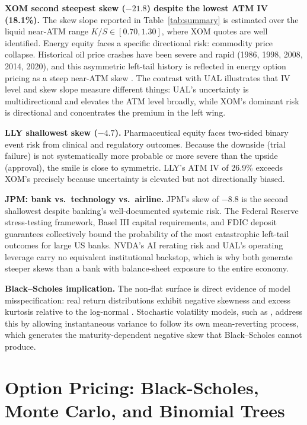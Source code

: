 \documentclass[12pt, a4paper]{article}
\begin{document}
\textbf{XOM second steepest skew ($-21.8$) despite the lowest ATM IV (18.1\%).} The
skew slope reported in Table~\ref{tab:summary} is estimated over the liquid near-ATM
range $K/S \in [0.70, 1.30]$, where XOM quotes are well identified. Energy equity faces
a specific directional risk: commodity price collapse. Historical oil price crashes have
been severe and rapid (1986, 1998, 2008, 2014, 2020), and this asymmetric left-tail
history is reflected in energy option pricing as a steep near-ATM skew \citep{Doran2008}.
The contrast with UAL illustrates that IV level and skew slope measure different things:
UAL's uncertainty is multidirectional and elevates the ATM level broadly, while XOM's
dominant risk is directional and concentrates the premium in the left wing.

\textbf{LLY shallowest skew ($-4.7$).} Pharmaceutical equity faces two-sided binary
event risk from clinical and regulatory outcomes. Because the downside (trial failure) is
not systematically more probable or more severe than the upside (approval), the smile is
close to symmetric. LLY's ATM IV of 26.9\% exceeds XOM's precisely because uncertainty
is elevated but not directionally biased.

\textbf{JPM: bank vs.\ technology vs.\ airline.} JPM's skew of $-8.8$ is the second
shallowest despite banking's well-documented systemic risk. The Federal Reserve
stress-testing framework, Basel III capital requirements, and FDIC deposit guarantees
collectively bound the probability of the most catastrophic left-tail outcomes for large
US banks. NVDA's AI rerating risk and UAL's operating leverage carry no equivalent
institutional backstop, which is why both generate steeper skews than a bank with
balance-sheet exposure to the entire economy.

\textbf{Black--Scholes implication.} The non-flat surface is direct evidence of model
misspecification: real return distributions exhibit negative skewness and excess kurtosis
relative to the log-normal \citep{Rubinstein1994}. Stochastic volatility models, such as
\citet{Heston1993}, address this by allowing instantaneous variance to follow its own
mean-reverting process, which generates the maturity-dependent negative skew that
Black--Scholes cannot produce.


\section{Option Pricing: Black-Scholes, Monte Carlo, and Binomial Trees}
\end{document}
